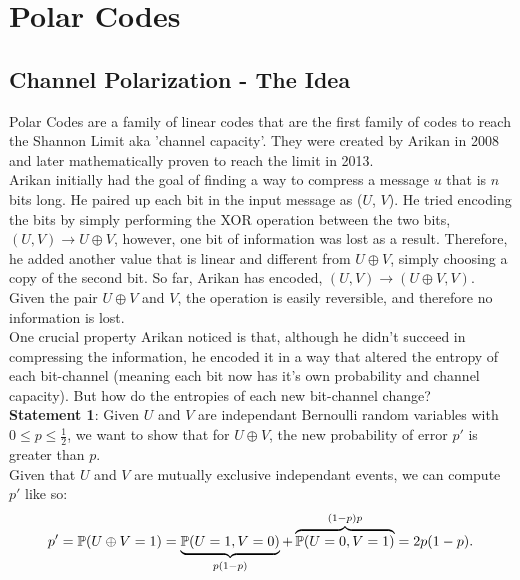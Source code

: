 \section{Polar Codes}

\subsection{Channel Polarization - The Idea}

Polar Codes are a family of linear codes that are the first family of codes to reach the Shannon Limit aka 'channel capacity'. They were created by Arikan in 2008 and later mathematically proven to reach the limit in 2013. \\


Arikan initially had the goal of finding a way to compress a message $u$ that is $n$ bits long. He paired up each bit in the input message as ($U$, $V$). He tried encoding the bits by simply performing the XOR operation between the two bits,  $(U, V) \to U \oplus V$, however, one bit of information was lost as a result. Therefore, he added another value that is linear and different from $U \oplus V$, simply choosing a copy of the second bit. So far, Arikan has encoded, $(U, V) \to (U \oplus V, V)$. Given the pair $U \oplus V$ and $V$, the operation is easily reversible, and therefore no information is lost. \\

One crucial property Arikan noticed is that, although he didn't succeed in compressing the information, he encoded it in a way that altered the entropy of each bit-channel (meaning each bit now has it's own probability and channel capacity). But how do the entropies of each new bit-channel change? \\

\textbf{Statement 1}: Given $U$ and $V$ are independant Bernoulli random variables with $0 \le p \le \frac{1}{2}$, we want to show that for $ U \oplus V$, the new probability of error $p'$ is greater than $p$. \\


Given that $U$ and $V$ are mutually exclusive independant events, we can compute $p'$ like so:
\[
 p' = \P(U \oplus V = 1) = \underbrace{\P(U=1, V=0)}_{p(1-p)} + \overbrace{\P(U=0, V=1)}^{(1-p)p}    = 2p(1-p).\\[-0.6cm]
\]


